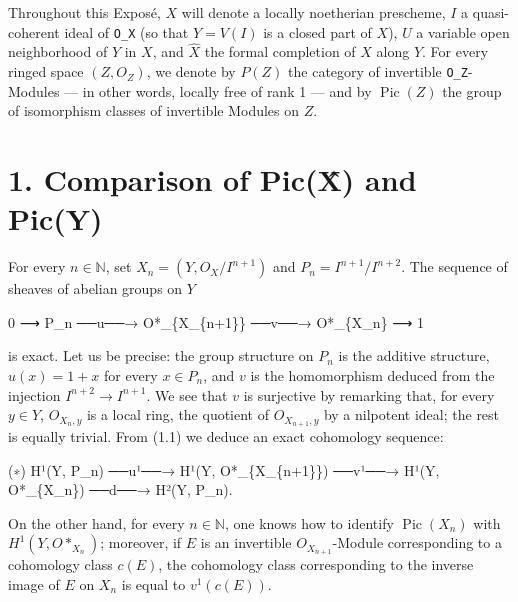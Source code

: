 \documentclass[
  11pt,
  a4paper,
]{book}
\newenvironment{Shaded}{}{}
\newcommand{\NormalTok}[1]{#1}
\begin{document}
Throughout this Exposé, \(X\) will denote a locally noetherian
prescheme, \(I\) a quasi-coherent ideal of \texttt{O\_X} (so that \(Y
= V(I)\) is a closed part of \(X\)), \(U\) a variable open neighborhood
of \(Y\) in \(X\), and \(\hat{X}\) the formal completion of \(X\) along
\(Y\). For every ringed space \((Z, O_{Z})\), we denote by \(P(Z)\) the
category of invertible \texttt{O\_Z}-Modules --- in other words, locally
free of rank 1 --- and by \(\operatorname{Pic}(Z)\) the group of
isomorphism classes of invertible Modules on \(Z\).

\section{1. Comparison of Pic(X̂) and
Pic(Y)}\label{comparison-of-picx-and-picy}

For every \(n \in \mathbb{N}\), set \(X_{n} = (Y, O_{X}/I^{n+1})\) and
\(P_{n} = I^{n+1}/I^{n+2}\). The sequence of sheaves of abelian groups
on \(Y\)

\begin{Shaded}
\begin{Highlighting}[]
\NormalTok{0 ⟶ P\_n ──u──→ O*\_\{X\_\{n+1\}\} ──v──→ O*\_\{X\_n\} ⟶ 1}
\end{Highlighting}
\end{Shaded}

is exact. Let us be precise: the group structure on \(P_{n}\) is the
additive structure, \(u(x) = 1 + x\) for every \(x \in
P_{n}\), and \(v\) is the homomorphism deduced from the injection
\(I^{n+2} \to I^{n+1}\). We see that \(v\) is surjective by remarking
that, for every \(y \in Y\), \(O_{X_{n}, y}\) is a local ring, the
quotient of \(O_{X_{n+1}, y}\) by a nilpotent ideal; the rest is equally
trivial. From (1.1) we deduce an exact cohomology sequence:

\begin{Shaded}
\begin{Highlighting}[]
\NormalTok{(∗)   H¹(Y, P\_n) ──u¹──→ H¹(Y, O*\_\{X\_\{n+1\}\}) ──v¹──→ H¹(Y, O*\_\{X\_n\}) ──d──→ H²(Y, P\_n).}
\end{Highlighting}
\end{Shaded}

On the other hand, for every \(n \in \mathbb{N}\), one knows how to
identify \(\operatorname{Pic}(X_{n})\) with \(H^{1}(Y,
O*_{X_{n}})\); moreover, if \(E\) is an invertible
\(O_{X_{n+1}}\)-Module corresponding to a cohomology class \(c(E)\), the
cohomology class corresponding to the inverse image of \(E\) on
\(X_{n}\) is equal to \(v^{1}(c(E))\).
\end{document}
